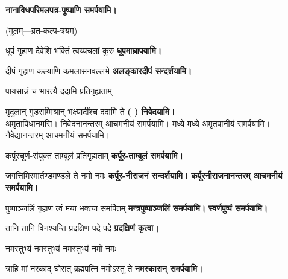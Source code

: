 \begingroup
\centering
\setlength{\columnseprule}{1pt}
\let\chapt\sect
\needspace{6em}




\endgroup

\textbf{\devAya{} नानाविध\-परिमल\-पत्र-पुष्पाणि समर्पयामि।}

\centerline{\small{(मूलम्—व्रत-कल्प-त्रयम्)}}
\begin{center}

{धूपं गृहाण देवेशि भक्तिं त्वय्यचलां कुरु}
\textbf{\devAya{} धूपमाघ्रापयामि।}
\medskip

{दीपं गृहाण कल्याणि कमलासनवल्लभे}
\textbf{\devAya{} अलङ्कारदीपं सन्दर्शयामि।}
\medskip

{पायसान्नं च भारत्यै ददामि प्रतिगृह्यताम्}

{मृदुलान् गुडसम्मिश्रान् भक्ष्यादींश्च ददामि ते}
\textbf{\devAya ( ) निवेदयामि।}\\
अमृतापिधानमसि। निवेदनानन्तरम् आचमनीयं समर्पयामि।
मध्ये मध्ये अमृतपानीयं समर्पयामि।
नैवेद्यानन्तरम् आचमनीयं समर्पयामि।
\medskip

{कर्पूरचूर्ण-संयुक्तं ताम्बूलं प्रतिगृह्यताम्}
\textbf{\devAya{} कर्पूर-ताम्बूलं समर्पयामि।}
\medskip

{जगत्तिमिरमार्तण्डमण्डले ते नमो नमः}
\textbf{\devAya{} कर्पूर-नीराजनं सन्दर्शयामि।}
\textbf{कर्पूरनीराजनानन्तरम् आचमनीयं समर्पयामि।}
\medskip

{पुष्पाञ्जलिं गृहाण त्वं मया भक्त्या समर्पितम्}
\textbf{\devAya{} मन्त्रपुष्पाञ्जलिं समर्पयामि।}
\textbf{स्वर्णपुष्पं समर्पयामि।}
\medskip

{तानि तानि विनश्यन्ति प्रदक्षिण-पदे पदे}
\textbf{प्रदक्षिणं कृत्वा।}
\medskip

{नमस्तुभ्यं नमस्तुभ्यं नमस्तुभ्यं नमो नमः}

{त्राहि मां नरकाद् घोरात् ब्रह्मपत्नि नमोऽस्तु ते}
\textbf{\devAya{} नमस्कारान् समर्पयामि।}
\medskip


\end{center}
